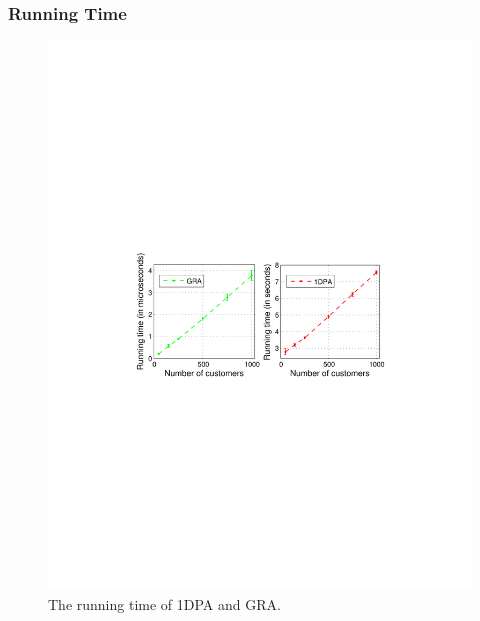 \subsubsection{Running Time}
\hspace{2cm}
\begin{figure}[!htb]\vspace{-5pt}
	\begin{center}
		\includegraphics[scale=0.55]{fig/rt.pdf}
	\end{center}\vspace{-5pt}
\caption{The running time of {\sc 1DPA} and {\sc GRA}.}
	\label{fig:rt}
\end{figure}



